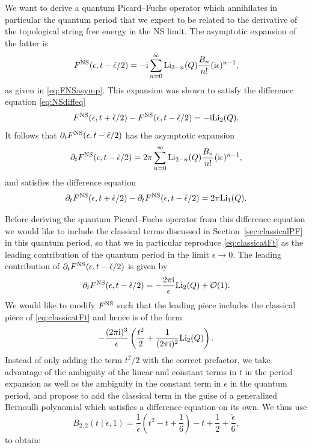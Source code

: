 \documentclass[pdftex]{sigma}
\numberwithin{equation}{section}
\begin{document}
We want to derive a quantum Picard--Fuchs operator which annihilates in particular the quantum period that we expect to be related to the derivative of the topological string free energy in the NS limit. The asymptotic expansion of the latter is
\begin{equation*}
F^{\rm NS}(\epsilon,t-\check{\epsilon}/2)= -\mathrm{i} \sum_{n=0}^{\infty} {\rm Li}_{3-n}(Q) \frac{B_n}{n!} (\mathrm{i}\epsilon)^{n-1},
\end{equation*}
as given in \eqref{eq:FNSasymp}. This expansion was shown to satisfy the difference equation \eqref{eq:NSdiffeq}
\begin{equation*}
 F^{\rm NS}(\epsilon,t+\check{\epsilon}/2)-F^{\rm NS}(\epsilon,t-\check\epsilon/2)= -\mathrm{i} {\rm Li}_2(Q).
\end{equation*}
It follows that $\partial_t F^{\rm NS}(\epsilon,t-\check{\epsilon}/2)$ has the asymptotic expansion
\begin{equation*}
\partial_t F^{\rm NS}(\epsilon,t-\check{\epsilon}/2)= 2\pi \sum_{n=0}^{\infty} {\rm Li}_{2-n}(Q) \frac{B_n}{n!} (\mathrm{i}\epsilon)^{n-1},
\end{equation*}
and satisfies the difference equation
\begin{equation*}
 \partial_t F^{\rm NS}(\epsilon,t+\check{\epsilon}/2)-\partial_t F^{\rm NS}(\epsilon,t-\check\epsilon/2)= 2\pi {\rm Li}_1(Q).
\end{equation*}

Before deriving the quantum Picard--Fuchs operator from this difference equation we would like to include the classical terms discussed in Section~\ref{sec:classicalPF} in this quantum period, so that we in particular reproduce \eqref{eq:classicatFt} as the leading contribution of the quantum period in the limit $\epsilon \to 0$. The leading contribution of $ \partial_t F^{\rm NS}(\epsilon,t-\check{\epsilon}/2)$ is given by
\begin{equation*}
 \partial_t F^{\rm NS}(\epsilon,t-\check{\epsilon}/2)= - \frac{2\pi \mathrm{i}}{\epsilon} {\rm Li}_{2}(Q) +\mathcal{O}(1).
\end{equation*}
We would like to modify $F^{\rm NS}$ such that the leading piece includes the classical piece of \eqref{eq:classicatFt} and hence is of the form
\begin{equation*} - \frac{(2\pi \mathrm{i})^3}{\epsilon} \left( \frac{t^2}{2} + \frac{1}{(2\pi \mathrm{i})^2} {\rm Li}_{2}(Q)\right).\end{equation*}
Instead of only adding the term $t^2/2$ with the correct prefactor, we take advantage of the ambiguity of the linear and constant terms in $t$ in the period expansion as well as the ambiguity in the constant term in $\epsilon$ in the quantum period, and propose to add the classical term in the guise of a generalized Bernoulli polynomial which satisfies a difference equation on its own. We thus use
\begin{equation*}
 B_{2,2}(t\mid \check{\epsilon},1)= \frac{1}{\check{\epsilon}} \left(t^2 - t + \frac{1}{6}\right) - t+\frac{1}{2}+ \frac{\check{\epsilon}}{6},
 \end{equation*}
to obtain:
\end{document}

